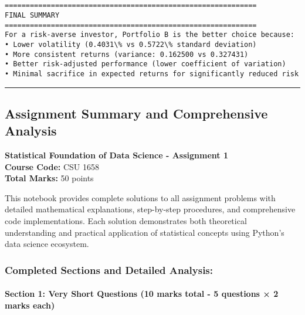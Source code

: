 \documentclass[11pt]{article}
\begin{document}
    \begin{center}
    \end{center}
    { \hspace*{\fill} \\}

    \begin{Verbatim}[commandchars=\\\{\}]

============================================================
FINAL SUMMARY
============================================================
For a risk-averse investor, Portfolio B is the better choice because:
• Lower volatility (0.4031\% vs 0.5722\% standard deviation)
• More consistent returns (variance: 0.162500 vs 0.327431)
• Better risk-adjusted performance (lower coefficient of variation)
• Minimal sacrifice in expected returns for significantly reduced risk
    \end{Verbatim}

    \begin{center}\rule{0.5\linewidth}{0.5pt}\end{center}

\subsection{Assignment Summary and Comprehensive
Analysis}\label{assignment-summary-and-comprehensive-analysis}

\textbf{Statistical Foundation of Data Science - Assignment 1}\\
\textbf{Course Code:} CSU 1658\\
\textbf{Total Marks:} 50 points

This notebook provides complete solutions to all assignment problems
with detailed mathematical explanations, step-by-step procedures, and
comprehensive code implementations. Each solution demonstrates both
theoretical understanding and practical application of statistical
concepts using Python's data science ecosystem.

\subsubsection{Completed Sections and Detailed
Analysis:}\label{completed-sections-and-detailed-analysis}

\paragraph{\texorpdfstring{\textbf{Section 1: Very Short Questions (10
marks total - 5 questions × 2 marks
each)}}{Section 1: Very Short Questions (10 marks total - 5 questions × 2 marks each)}}\label{section-1-very-short-questions-10-marks-total---5-questions-2-marks-each}
\end{document}
